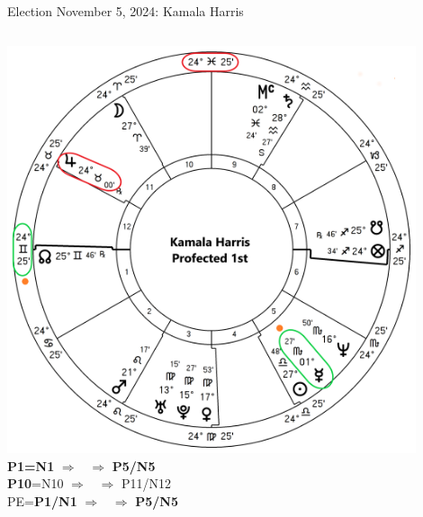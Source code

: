 \begin{frame}[t]{Election November 5, 2024: Kamala Harris}
\begin{columns}[T, onlytextwidth]
\vspace{-1em}
{\includegraphics[width=0.9\textwidth]{charts/Harris-Prof-1st.png}}
\fontsize{8pt}{9pt}\selectfont
\textbf{\dgreen P1=N1}
	$\Rightarrow$ \Mercury\, $\Rightarrow$ \textbf{\dgreen P5/N5}\\
\textbf{\red P10}=N10
	$\Rightarrow$ \Jupiter\, $\Rightarrow$ P11/N12\\
PE=\textbf{\dgreen P1/N1}
	 $\Rightarrow$ \Mercury\, $\Rightarrow$ \textbf{\dgreen P5/N5}

\end{columns}
\end{frame}

